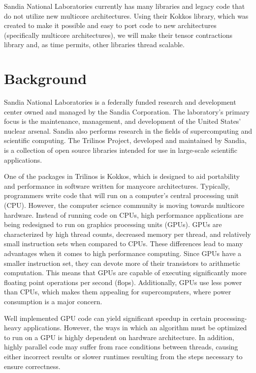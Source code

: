 \documentclass[proposal]{hmcclinic}
\begin{document}
Sandia National Laboratories currently has many libraries and legacy code that
do not utilize new multicore architectures. Using their Kokkos library, which
was created to make it possible and easy to port code to new architectures
(specifically multicore architectures), we will make their tensor contractions
library and, as time permits, other libraries thread scalable.


\section{Background}

Sandia National Laboratories is a federally funded research and development
center owned and managed by the Sandia Corporation.  The laboratory's primary
focus is the maintenance, management, and development of the United States'
nuclear arsenal.  Sandia also performs research in the fields of supercomputing
and scientific computing.  The Trilinos Project, developed and maintained by
Sandia, is a collection of open source libraries intended for use in large-scale
scientific applications.

One of the packages in Trilinos is Kokkos, which is designed to aid portability
and performance in software written for manycore architectures.  Typically, programmers
write code that will run on a computer's central processing unit (CPU). However,
the computer science community is moving towards multicore hardware. Instead of
running code on CPUs, high performance applications are being redesigned to run on
graphics processing units (GPUs). GPUs are characterized by high thread counts, decreased
memory per thread, and relatively small instruction sets when compared to CPUs. These 
differences lead to many advantages when it comes to high performance computing. Since
GPUs have a smaller instruction set, they can devote more of their transistors to arithmetic 
computation. This means that GPUs are capable of executing significantly more floating point
operations per second (flops). Additionally, GPUs use less power than CPUs, which makes
them appealing for supercomputers, where power consumption is a major concern.

Well implemented GPU code can yield significant speedup in certain
processing-heavy applications.  However, the ways in which an algorithm must be optimized 
to run on a GPU is highly dependent on hardware architecture.  In
addition, highly parallel code may suffer from race conditions between threads,
causing either incorrect results or slower runtimes resulting from the steps
necessary to ensure correctness.
\end{document}
